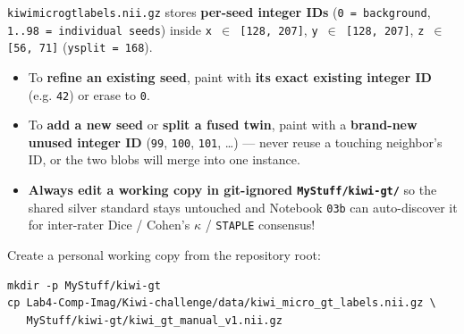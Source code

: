 \documentclass[10pt,a4paper]{article}
\renewcommand{\_}{\origunderscore\allowbreak}
\begin{document}
\begin{clinbox}
\texttt{kiwi\_micro\_gt\_labels.nii.gz} stores \textbf{per-seed integer IDs} (\texttt{0 = background}, \texttt{1..98 = individual seeds}) inside \texttt{x $\in$ [128, 207]}, \texttt{y $\in$ [128, 207]}, \texttt{z $\in$ [56, 71]} (\texttt{y\_split = 168}).
\begin{itemize}
\item To \textbf{refine an existing seed}, paint with \textbf{its exact existing integer ID} (e.g. \texttt{42}) or erase to \texttt{0}.
\item To \textbf{add a new seed} or \textbf{split a fused twin}, paint with a \textbf{brand-new unused integer ID} (\texttt{99}, \texttt{100}, \texttt{101}, \ldots{}) --- never reuse a touching neighbor's ID, or the two blobs will merge into one instance.
\item \textbf{Always edit a working copy in git-ignored \texttt{MyStuff/\allowbreak{}kiwi-gt/\allowbreak{}}} so the shared silver standard stays untouched and Notebook \texttt{03b} can auto-discover it for inter-rater Dice /\allowbreak{} Cohen's $\kappa$ /\allowbreak{} \texttt{STAPLE} consensus!
\end{itemize}
\end{clinbox}

Create a personal working copy from the repository root:
\begin{lstlisting}[style=bashbmed]
mkdir -p MyStuff/kiwi-gt
cp Lab4-Comp-Imag/Kiwi-challenge/data/kiwi_micro_gt_labels.nii.gz \
   MyStuff/kiwi-gt/kiwi_gt_manual_v1.nii.gz
\end{lstlisting}
\end{document}
